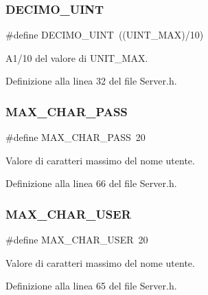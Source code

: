 \mbox{\label{a00050_af5bf75ca4c78ac29cde0cf581bbbba8c}} 
\subsubsection{\texorpdfstring{DECIMO\_UINT}{DECIMO\_UINT}}
{\footnotesize\ttfamily \#define D\+E\+C\+I\+M\+O\+\_\+\+U\+I\+NT~((U\+I\+N\+T\+\_\+\+M\+AX)/10)}



A1/10 del valore di U\+N\+I\+T\+\_\+\+M\+AX. 



Definizione alla linea 32 del file Server.\+h.

\mbox{\label{a00050_ae15aadb253d64179b684ad4dad2ec39c}} 
\subsubsection{\texorpdfstring{MAX\_CHAR\_PASS}{MAX\_CHAR\_PASS}}
{\footnotesize\ttfamily \#define M\+A\+X\+\_\+\+C\+H\+A\+R\+\_\+\+P\+A\+SS~20}



Valore di caratteri massimo del nome utente. 



Definizione alla linea 66 del file Server.\+h.

\mbox{\label{a00050_a18e9e79b7a0fd224d66258d08f939cc4}} 
\subsubsection{\texorpdfstring{MAX\_CHAR\_USER}{MAX\_CHAR\_USER}}
{\footnotesize\ttfamily \#define M\+A\+X\+\_\+\+C\+H\+A\+R\+\_\+\+U\+S\+ER~20}



Valore di caratteri massimo del nome utente. 



Definizione alla linea 65 del file Server.\+h.

\mbox{\label{a00050_ab8ba2d8f79af5ca38005742bbc29a927}} 
